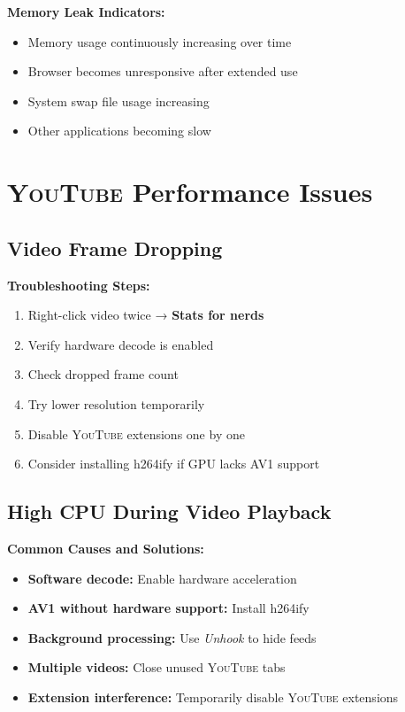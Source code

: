 \documentclass[11pt,a4paper,oneside]{book}
\newcommand{\youtube}{\textsc{YouTube}}
\newcommand{\menupath}[1]{\textbf{\color{darkgray}#1}}
\newcommand{\extension}[1]{\textit{\color{primaryblue}#1}}
\begin{document}
\begin{warningbox}
\textbf{Memory Leak Indicators:}
\begin{itemize}
    \item Memory usage continuously increasing over time
    \item Browser becomes unresponsive after extended use
    \item System swap file usage increasing
    \item Other applications becoming slow
\end{itemize}
\end{warningbox}

\section{\youtube{} Performance Issues}

\subsection{Video Frame Dropping}

\textbf{Troubleshooting Steps:}
\begin{enumerate}
    \item Right-click video twice → \menupath{Stats for nerds}
    \item Verify hardware decode is enabled
    \item Check dropped frame count
    \item Try lower resolution temporarily
    \item Disable \youtube{} extensions one by one
    \item Consider installing h264ify if GPU lacks AV1 support
\end{enumerate}

\subsection{High CPU During Video Playback}

\textbf{Common Causes and Solutions:}
\begin{itemize}
    \item \textbf{Software decode:} Enable hardware acceleration
    \item \textbf{AV1 without hardware support:} Install h264ify
    \item \textbf{Background processing:} Use \extension{Unhook} to hide feeds
    \item \textbf{Multiple videos:} Close unused \youtube{} tabs
    \item \textbf{Extension interference:} Temporarily disable \youtube{} extensions
\end{itemize}
\end{document}
